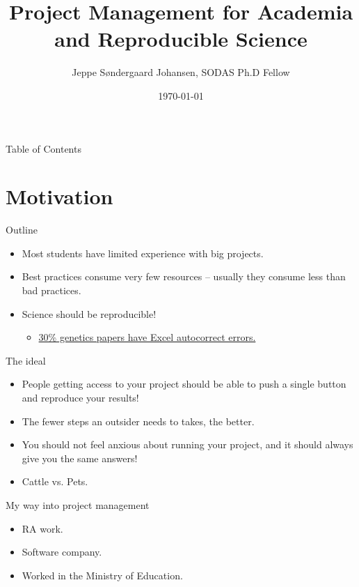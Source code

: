 \documentclass{beamer}
\title{Project Management for Academia and Reproducible Science}
\author{Jeppe Søndergaard Johansen, SODAS Ph.D Fellow}
\date{\today}
\begin{document}
\begin{frame}
\titlepage %
\end{frame}

\begin{frame}{Table of Contents}
  \tableofcontents
\end{frame}

\section{Motivation}

\begin{frame}{Outline}
\begin{itemize}
    \item Most students have limited experience with big projects.
    \item Best practices consume very few resources – usually they consume less than bad practices.
    \item Science should be reproducible!
    \begin{itemize}
        \item \href{https://www.nature.com/articles/d41586-021-02211-4}{30\% genetics papers have Excel autocorrect errors.}
    \end{itemize}
\end{itemize}
\end{frame}


\begin{frame}{The ideal}

\begin{itemize}
    \item People getting access to your project should be able to push a single button and reproduce your results!
    \item The fewer steps an outsider needs to takes, the better.
    \item You should not feel anxious about running your project, and it should always give you the same answers!
    \item Cattle vs. Pets.
\end{itemize}

\end{frame}

\begin{frame}{My way into project management}
\begin{itemize}
    \item RA work.
    \item Software company.
    \item Worked in the Ministry of Education.
\end{itemize}
\end{frame}
\end{document}
